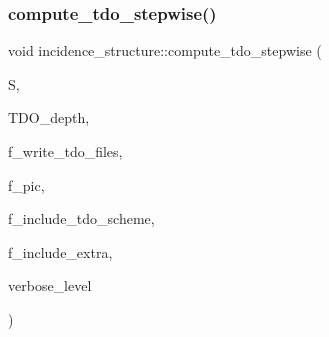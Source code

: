 \mbox{\label{classincidence__structure_a91a7039b74c96b39bcd084b02181f191}} 
\subsubsection{\texorpdfstring{compute\+\_\+tdo\+\_\+stepwise()}{compute\_tdo\_stepwise()}}
{\footnotesize\ttfamily void incidence\+\_\+structure\+::compute\+\_\+tdo\+\_\+stepwise (\begin{DoxyParamCaption}\item[{\mbox{\hyperlink{classpartitionstack}{partitionstack}} \&}]{S,  }\item[{\mbox{\hyperlink{galois_8h_a09fddde158a3a20bd2dcadb609de11dc}{I\+NT}}}]{T\+D\+O\+\_\+depth,  }\item[{\mbox{\hyperlink{galois_8h_a09fddde158a3a20bd2dcadb609de11dc}{I\+NT}}}]{f\+\_\+write\+\_\+tdo\+\_\+files,  }\item[{\mbox{\hyperlink{galois_8h_a09fddde158a3a20bd2dcadb609de11dc}{I\+NT}}}]{f\+\_\+pic,  }\item[{\mbox{\hyperlink{galois_8h_a09fddde158a3a20bd2dcadb609de11dc}{I\+NT}}}]{f\+\_\+include\+\_\+tdo\+\_\+scheme,  }\item[{\mbox{\hyperlink{galois_8h_a09fddde158a3a20bd2dcadb609de11dc}{I\+NT}}}]{f\+\_\+include\+\_\+extra,  }\item[{\mbox{\hyperlink{galois_8h_a09fddde158a3a20bd2dcadb609de11dc}{I\+NT}}}]{verbose\+\_\+level }\end{DoxyParamCaption})}

\mbox{\label{classincidence__structure_ada3fae9fd1819b36e6bfe18dedd01e6a}} 

